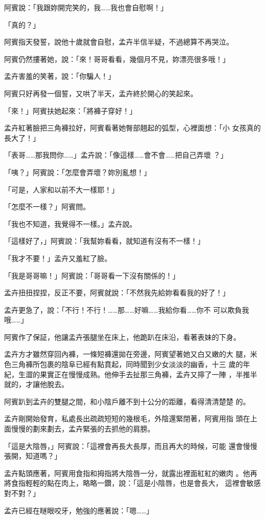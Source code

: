 阿賓說：「我跟妳開完笑的，我……我也會自慰啊！」

「真的？」

阿賓指天發誓，說他十歲就會自慰，孟卉半信半疑，不過總算不再哭泣。

阿賓仍然摟著她，說：「來！哥哥看看，幾個月不見，妳漂亮很多哦！」

孟卉害羞的笑著，說：「你騙人！」

阿賓只好再發一個誓，又哄了半天，孟卉終於開心的笑起來。

「來！」阿賓扶她起來：「將褲子穿好！」

孟卉紅著臉把三角褲拉好，阿賓看著她臀部翹起的弧型，心裡面想：「小
女孩真的長大了！」

「表哥……那我問你……」孟卉說：「像這樣……會不會……把自己弄壞
？」

「咦？」阿賓說：「怎麼會弄壞？妳別亂想！」

「可是，人家和以前不大一樣耶！」

「怎麼不一樣？」阿賓問。

「我也不知道，我覺得不一樣。」孟卉說。

「這樣好了，」阿賓說：「我幫妳看看，就知道有沒有不一樣！」

「我才不要！」孟卉又羞紅了臉。

「我是哥哥嘛！」阿賓說：「哥哥看一下沒有關係的！」

孟卉扭扭捏捏，反正不要，阿賓就說：「不然我先給妳看看我的好了！」

孟卉更急了，說：「不行！不行！……那……好嘛……我給你看……你不
可以欺負我哦……」

阿賓作了保証，他讓孟卉張腿坐在床上，他跪趴在床沿，看著表妹的下身。

孟卉方才雖然穿回內褲，一條短褲還拋在旁邊，阿賓望著她又白又嫩的大
腿，米色三角褲所包裹的陰阜已經有點賁起，同時聞到少女淡淡的幽香，十三
歲的年紀，生澀的果實正在慢慢成熟。他伸手去扯那三角褲，孟卉又擰了一陣
，半推半就的，才讓他脫去。

阿賓趴到孟卉的雙腿之間，和小陰戶離不到十公分的距離，看得清清楚楚
的。

孟卉剛開始發育，私處長出疏疏短短的幾根毛，外陰還緊閉著，阿賓用指
頭在上面慢慢的劃來劃去，孟卉緊張的去抓他的肩膀。

「這是大陰唇，」阿賓說：「這裡會再長大長厚，而且再大的時候，可能
還會慢慢張開，知道嗎？」

孟卉點頭應著，阿賓用食指和拇指將大陰唇一分，就露出裡面紅紅的嫩肉
。他再將食指輕輕的點在肉上，略略一鑽，說：「這是小陰唇，也是會長大，
這裡會敏感對不對？」

孟卉已經在瞇眼咬牙，勉強的應著說：「嗯……」

